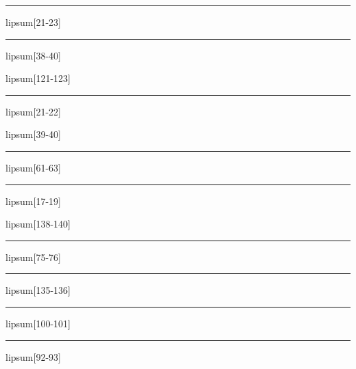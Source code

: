 \documentclass[11pt,a4paper]{article}
\begin{document}
\begin{simplewrap}
  \textcolor{olive!13}{\rule{4.2cm}{5.0cm}}
\end{simplewrap}
lipsum[21-23]

\begin{simplewrap}
  \textcolor{red!30}{\rule{5.8cm}{8.7cm}}
\end{simplewrap}
lipsum[38-40]

lipsum[121-123]

\begin{simplewrap}
  \textcolor{purple!58}{\rule{5.1cm}{5.6cm}}
\end{simplewrap}
lipsum[21-22]

lipsum[39-40]

\begin{simplewrap}
  \textcolor{magenta!56}{\rule{4.8cm}{5.4cm}}
\end{simplewrap}
lipsum[61-63]

\begin{simplewrap}
  \textcolor{blue!25}{\rule{4.3cm}{8.4cm}}
\end{simplewrap}
lipsum[17-19]

lipsum[138-140]

\begin{simplewrap}
  \textcolor{red!50}{\rule{4.5cm}{3.9cm}}
\end{simplewrap}
lipsum[75-76]

\begin{simplewrap}
  \textcolor{lime!25}{\rule{4.7cm}{3.5cm}}
\end{simplewrap}
lipsum[135-136]

\begin{simplewrap}
  \textcolor{green!43}{\rule{4.6cm}{8.3cm}}
\end{simplewrap}
lipsum[100-101]

\begin{simplewrap}
  \textcolor{blue!50}{\rule{4.2cm}{5.0cm}}
\end{simplewrap}
lipsum[92-93]
\end{document}
